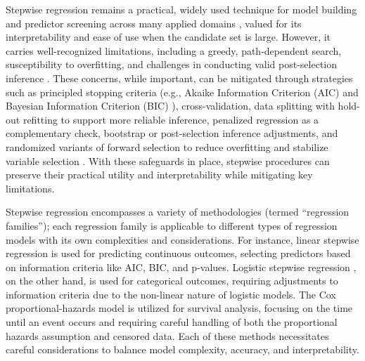 Stepwise regression remains a practical, widely used technique for model building and predictor screening across many applied domains \citep{RN32, RN36, RN28, RN30, RN35, RN57, RN52, RN62, RN60, RN43, RN51, RN55, RN50}, valued for its interpretability and ease of use when the candidate set is large. However, it carries well-recognized limitations, including a greedy, path-dependent search, susceptibility to overfitting, and challenges in conducting valid post-selection inference \citep{RN70, RN73, RN71, RN72, RN69}. These concerns, while important, can be mitigated through strategies such as principled stopping criteria (e.g., Akaike Information Criterion (AIC) \citep{RN4, RN14, RN1, RN10} and Bayesian Information Criterion (BIC) \citep{RN10, RN18}), cross-validation, data splitting with hold-out refitting to support more reliable inference, penalized regression as a complementary check, bootstrap or post-selection inference adjustments, and randomized variants of forward selection to reduce overfitting and stabilize variable selection \citep{hastie2009elements, ohara2009review, george1993bayesian, mitchell1988bayesian, stone1974cross, efron1993introduction, hastie2009elements, Tibshirani_1996}. With these safeguards in place, stepwise procedures can preserve their practical utility and interpretability while mitigating key limitations.

Stepwise regression encompasses a variety of methodologies (termed ``regression families''); each regression family is applicable to different types of regression models with its own complexities and considerations. For instance, linear stepwise regression \citep{draper1998applied, burnham2002model} is used for predicting continuous outcomes, selecting predictors based on information criteria like AIC, BIC, and p-values. Logistic stepwise regression \citep{hosmer2013applied, menard2002applied}, on the other hand, is used for categorical outcomes, requiring adjustments to information criteria due to the non-linear nature of logistic models. The Cox proportional-hazards model \citep{cox1972regression, RN88} is utilized for survival analysis, focusing on the time until an event occurs and requiring careful handling of both the proportional hazards assumption and censored data. Each of these methods necessitates careful considerations to balance model complexity, accuracy, and interpretability.


